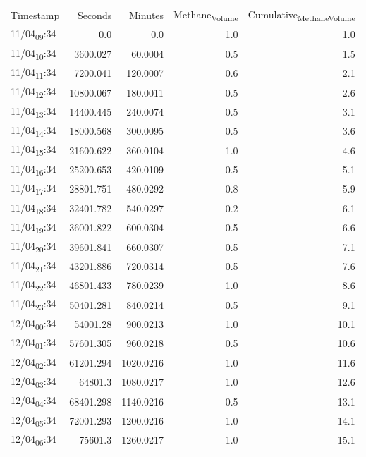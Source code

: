 \documentclass[11pt]{article}
\begin{document}
\begin{center}
\begin{tabular}{lrrrr}
Timestamp & Seconds & Minutes & Methane\textsubscript{Volume} & Cumulative\textsubscript{Methane}\textsubscript{Volume}\\[0pt]
11/04\textsubscript{09}:34 & 0.0 & 0.0 & 1.0 & 1.0\\[0pt]
11/04\textsubscript{10}:34 & 3600.027 & 60.0004 & 0.5 & 1.5\\[0pt]
11/04\textsubscript{11}:34 & 7200.041 & 120.0007 & 0.6 & 2.1\\[0pt]
11/04\textsubscript{12}:34 & 10800.067 & 180.0011 & 0.5 & 2.6\\[0pt]
11/04\textsubscript{13}:34 & 14400.445 & 240.0074 & 0.5 & 3.1\\[0pt]
11/04\textsubscript{14}:34 & 18000.568 & 300.0095 & 0.5 & 3.6\\[0pt]
11/04\textsubscript{15}:34 & 21600.622 & 360.0104 & 1.0 & 4.6\\[0pt]
11/04\textsubscript{16}:34 & 25200.653 & 420.0109 & 0.5 & 5.1\\[0pt]
11/04\textsubscript{17}:34 & 28801.751 & 480.0292 & 0.8 & 5.9\\[0pt]
11/04\textsubscript{18}:34 & 32401.782 & 540.0297 & 0.2 & 6.1\\[0pt]
11/04\textsubscript{19}:34 & 36001.822 & 600.0304 & 0.5 & 6.6\\[0pt]
11/04\textsubscript{20}:34 & 39601.841 & 660.0307 & 0.5 & 7.1\\[0pt]
11/04\textsubscript{21}:34 & 43201.886 & 720.0314 & 0.5 & 7.6\\[0pt]
11/04\textsubscript{22}:34 & 46801.433 & 780.0239 & 1.0 & 8.6\\[0pt]
11/04\textsubscript{23}:34 & 50401.281 & 840.0214 & 0.5 & 9.1\\[0pt]
12/04\textsubscript{00}:34 & 54001.28 & 900.0213 & 1.0 & 10.1\\[0pt]
12/04\textsubscript{01}:34 & 57601.305 & 960.0218 & 0.5 & 10.6\\[0pt]
12/04\textsubscript{02}:34 & 61201.294 & 1020.0216 & 1.0 & 11.6\\[0pt]
12/04\textsubscript{03}:34 & 64801.3 & 1080.0217 & 1.0 & 12.6\\[0pt]
12/04\textsubscript{04}:34 & 68401.298 & 1140.0216 & 0.5 & 13.1\\[0pt]
12/04\textsubscript{05}:34 & 72001.293 & 1200.0216 & 1.0 & 14.1\\[0pt]
12/04\textsubscript{06}:34 & 75601.3 & 1260.0217 & 1.0 & 15.1\\[0pt]

\end{tabular}
\end{center}
\end{document}
